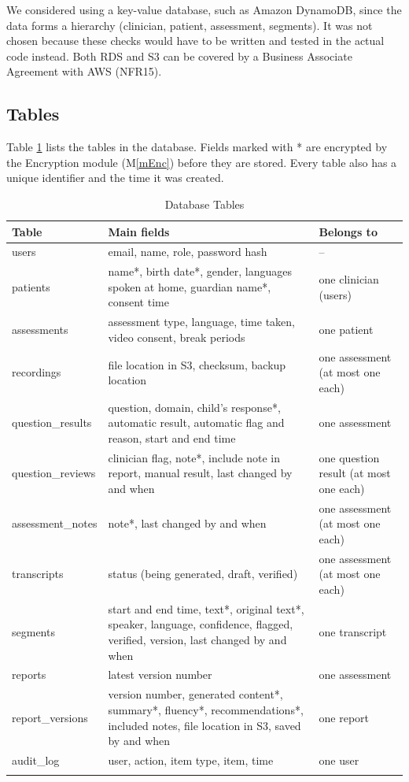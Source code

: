 \documentclass[12pt, titlepage]{article}
\newcommand{\mref}[1]{M\ref{#1}}
\begin{document}
We considered using a key-value database, such as Amazon DynamoDB, since the data forms a hierarchy (clinician, patient, assessment, segments). It was not chosen because these checks would have to be written and tested in the actual code instead. Both RDS and S3 can be covered by a Business Associate Agreement with AWS (NFR15).

\subsection{Tables}

Table \ref{TblTables} lists the tables in the database. Fields marked with * are encrypted by the Encryption module (\mref{mEnc}) before they are stored. Every table also has a unique identifier and the time it was created.

{\small
\begin{longtable}{p{} p{} p{}}
\toprule
\textbf{Table} & \textbf{Main fields} & \textbf{Belongs to}\\
\midrule
\endhead
users & email, name, role, password hash & --\\
patients & name*, birth date*, gender, languages spoken at home, guardian name*, consent time & one clinician (users)\\
assessments & assessment type, language, time taken, video consent, break periods & one patient\\
recordings & file location in S3, checksum, backup location & one assessment (at most one each)\\
question\_results & question, domain, child's response*, automatic result, automatic flag and reason, start and end time & one assessment\\
question\_reviews & clinician flag, note*, include note in report, manual result, last changed by and when & one question result (at most one each)\\
assessment\_notes & note*, last changed by and when & one assessment (at most one each)\\
transcripts & status (being generated, draft, verified) & one assessment (at most one each)\\
segments & start and end time, text*, original text*, speaker, language, confidence, flagged, verified, version, last changed by and when & one transcript\\
reports & latest version number & one assessment\\
report\_versions & version number, generated content*, summary*, fluency*, recommendations*, included notes, file location in S3, saved by and when & one report\\
audit\_log & user, action, item type, item, time & one user\\
\bottomrule
\caption{Database Tables}
\label{TblTables}
\end{longtable}
}
\end{document}
